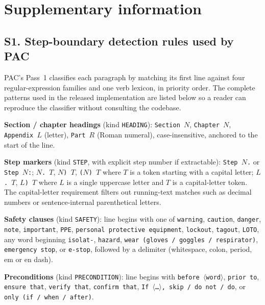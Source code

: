\documentclass[fleqn,10pt]{wlscirep}
\begin{document}
\section*{Supplementary information}

\subsection*{S1. Step-boundary detection rules used by PAC}

PAC's Pass~1 classifies each paragraph by matching its first line
against four regular-expression families and one verb lexicon, in
priority order. The complete patterns used in the released
implementation are listed below so a reader can reproduce the
classifier without consulting the codebase.

\textbf{Section / chapter headings} (kind \texttt{HEADING}):
\texttt{Section~$N$}, \texttt{Chapter~$N$}, \texttt{Appendix~$L$}
(letter), \texttt{Part~$R$} (Roman numeral), case-insensitive,
anchored to the start of the line.

\textbf{Step markers} (kind \texttt{STEP}, with explicit step number
if extractable): \texttt{Step~$N$.} or \texttt{Step~$N$:};
\texttt{$N$.~$T$}, \texttt{$N$)~$T$}, \texttt{($N$)~$T$} where $T$ is
a token starting with a capital letter; \texttt{$L$.~$T$},
\texttt{$L$)~$T$} where $L$ is a single uppercase letter and $T$ is a
capital-letter token. The capital-letter requirement filters out
running-text matches such as decimal numbers or sentence-internal
parenthetical letters.

\textbf{Safety clauses} (kind \texttt{SAFETY}): line begins with one
of \texttt{warning}, \texttt{caution}, \texttt{danger}, \texttt{note},
\texttt{important}, \texttt{PPE}, \texttt{personal protective
equipment}, \texttt{lockout}, \texttt{tagout}, \texttt{LOTO}, any word
beginning \texttt{isolat-}, \texttt{hazard}, \texttt{wear (gloves /
goggles / respirator)}, \texttt{emergency stop}, or \texttt{e-stop},
followed by a delimiter (whitespace, colon, period, em or en dash).

\textbf{Preconditions} (kind \texttt{PRECONDITION}): line begins with
\texttt{before $\langle$word$\rangle$}, \texttt{prior to},
\texttt{ensure that}, \texttt{verify that}, \texttt{confirm that},
\texttt{If~$\langle$\dots$\rangle$, skip / do not / do}, or
\texttt{only (if / when / after)}.
\end{document}
